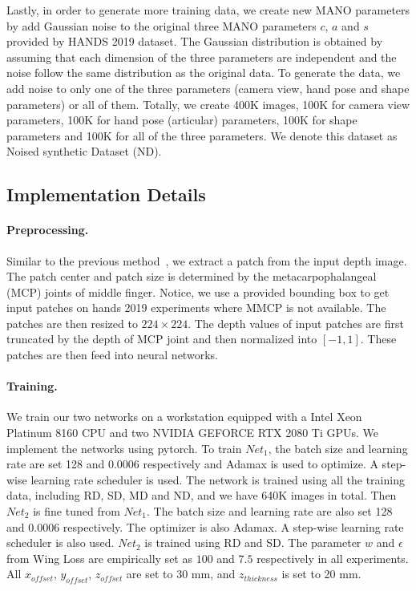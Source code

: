 \documentclass{article}
\begin{document}
Lastly, in order to generate more training data, we create new MANO parameters by add Gaussian noise to the original three MANO parameters $c$, $a$ and $s$ provided by HANDS 2019 dataset. The Gaussian distribution is obtained by assuming that each dimension of the three parameters are independent and the noise follow the same distribution as the original data. 
To generate the data, we add noise to only one of the three parameters (camera view, hand pose and shape parameters) or all of them. Totally, we create 400K images, 100K for camera view parameters, 100K for hand pose (articular) parameters, 100K for shape parameters and 100K for all of the three parameters. We denote this dataset as Noised
synthetic Dataset (ND).


\subsection{Implementation Details}\label{sec:detail}
\paragraph{Preprocessing.}
Similar to the previous method~\cite{chen2019pose}, we
extract a patch from the input depth image.
The patch center and patch size is determined by the metacarpophalangeal (MCP) joints of middle finger. Notice, we use a provided bounding box to get input patches on hands 2019 experiments where MMCP is not available. 
The patches are then resized to $224\times 224$.
The depth values of input patches are first truncated by the depth of MCP joint and then normalized into $[-1, 1]$.
These patches are then feed into neural networks.

\paragraph{Training.}
We train our two networks on a workstation equipped with a Intel Xeon Platinum 8160 CPU and two NVIDIA GEFORCE RTX 2080 Ti GPUs. We implement the networks using pytorch. To train $Net_1$, the batch size and learning rate are set 128 and $0.0006$ respectively and Adamax is used to optimize. 
A step-wise learning rate scheduler is used. The network is trained using all the training data, including RD, SD, MD and ND, and we have 640K images in total.
Then $Net_2$ is fine tuned from $Net_1$. The batch size and learning rate are also set 128 and $0.0006$ respectively. The optimizer is also Adamax. A step-wise learning rate scheduler is also used.
$Net_2$ is trained using RD and SD.
The parameter $w$ and $\epsilon$ from Wing Loss are empirically set as $100$ and $7.5$ respectively in all experiments.
All $x_{offset}$, $y_{offset}$, $z_{offset}$ are set to 30 mm, and $z_{thickness}$ is set to 20 mm. 
 
\end{document}
